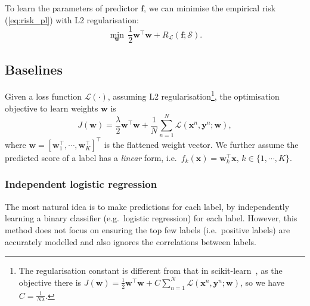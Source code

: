\documentclass[9pt]{extarticle}
\newcommand{\f}{\mathbf{f}}
\newcommand{\x}{\mathbf{x}}
\newcommand{\y}{\mathbf{y}}
\newcommand{\1}{\mathbf{1}}
\newcommand{\w}{\mathbf{w}}
\newcommand{\LCal}{\mathcal{L}}
\newcommand{\SCal}{\mathcal{S}}
\newcommand{\eg}{e.g.\ }
\newcommand{\ie}{i.e.\ }
\begin{document}
To learn the parameters of predictor $\f$, we can minimise the empirical risk (\ref{eq:risk_pl}) with L2 regularisation:
\begin{equation}
\label{eq:minrisk_l2}
\min_{\w} \, \frac{1}{2} \w^\top \w + R_{\LCal}(\f; \SCal).
\end{equation}


\subsection{Baselines}


Given a loss function $\LCal(\cdot)$, assuming L2 regularisation\footnote{
The regularisation constant is different from that in scikit-learn~\cite{sklearn-guide}, 
as the objective there is $J(\w) = \frac{1}{2}\w^\top \w + C \sum_{n=1}^N \LCal(\x^n, \y^n; \w)$, so we have $C = \frac{1}{N \lambda}$.},
the optimisation objective to learn weights $\w$ is
\begin{equation}
\label{eq:obj}
J(\w) = \frac{\lambda}{2}\w^\top \w + \frac{1}{N} \sum_{n=1}^N \LCal(\x^n, \y^n; \w),
\end{equation}
where $\w = [\w_1^\top, \cdots, \w_K^\top]^\top$ is the flattened weight vector.
We further assume the predicted score of a label has a \emph{linear} form, \ie $f_k(\x) = \w_k^\top \x, \, k \in \{1,\cdots,K\}$.



\subsubsection{Independent logistic regression}
\label{sssec:logistic}
The most natural idea is to make predictions for each label, by independently learning a binary classifier (\eg logistic regression) for each label.
However, this method does not focus on ensuring the top few labels (\ie positive labels) are accurately modelled 
and also ignores the correlations between labels.
\end{document}
